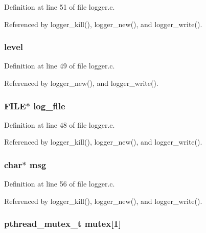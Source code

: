 Definition at line 51 of file logger.\+c.



Referenced by logger\+\_\+kill(), logger\+\_\+new(), and logger\+\_\+write().

\hypertarget{structlogger_a77f7159081bd39a76d8b86af56256201}{
\subsubsection[{level}]{ level}}\label{structlogger_a77f7159081bd39a76d8b86af56256201}


Definition at line 49 of file logger.\+c.



Referenced by logger\+\_\+new(), and logger\+\_\+write().

\hypertarget{structlogger_ab936051f5aaca44c6c3c41dee0d19c36}{
\subsubsection[{log\+\_\+file}]{\setlength{\rightskip}{0pt plus 5cm}F\+I\+L\+E$\ast$ log\+\_\+file}}\label{structlogger_ab936051f5aaca44c6c3c41dee0d19c36}


Definition at line 48 of file logger.\+c.



Referenced by logger\+\_\+kill(), logger\+\_\+new(), and logger\+\_\+write().

\hypertarget{structlogger_a32d2f5216cddb59c7cc8fb2806a7e727}{
\subsubsection[{msg}]{\setlength{\rightskip}{0pt plus 5cm}char$\ast$ msg}}\label{structlogger_a32d2f5216cddb59c7cc8fb2806a7e727}


Definition at line 56 of file logger.\+c.



Referenced by logger\+\_\+kill(), logger\+\_\+new(), and logger\+\_\+write().

\hypertarget{structlogger_ab4293016252c4d4e63549b0773fa0f33}{
\subsubsection[{mutex}]{\setlength{\rightskip}{0pt plus 5cm}pthread\+\_\+mutex\+\_\+t mutex\mbox{[}1\mbox{]}}}\label{structlogger_ab4293016252c4d4e63549b0773fa0f33}


